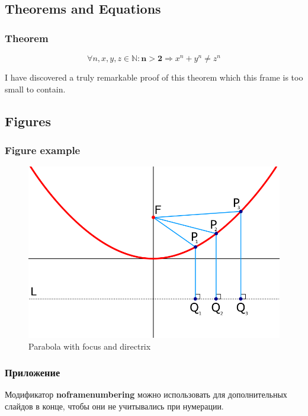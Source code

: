 \documentclass[aspectratio=169]{beamer}
\begin{document}
\subsection{Theorems and Equations}


\begin{frame}
\frametitle{Theorem}
\begin{theorem}
\begin{equation}
    \forall n, x, y, z \in \mathbb{N}: \mathbf{n > 2} \Rightarrow x^n + y^n \neq z^n
\end{equation}
\end{theorem}
I have discovered a truly remarkable proof of this theorem which this frame is too small to contain.
\end{frame}


\subsection{Figures}


\begin{frame}
\frametitle{Figure example}
\begin{figure}
    \includegraphics[scale=.3]{fig/parabola.png}
    \caption{Parabola with focus and directrix}
\end{figure}
\end{frame}


\begin{frame}[plain]
\end{frame}

\begin{frame}[noframenumbering]
\frametitle{Приложение}
    \large
    Модификатор \textbf{noframenumbering} можно использовать для дополнительных слайдов в конце, чтобы они не учитывались при нумерации.
\end{frame}
\end{document}
